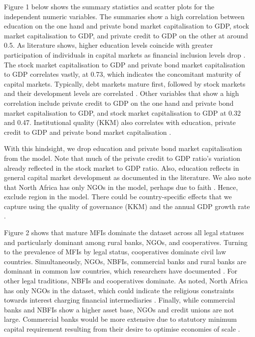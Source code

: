 \documentclass[a4paper, nobind]{templates/ociamthesis}
\begin{document}
Figure 1 below shows the summary statistics and scatter plots for the independent numeric variables. The summaries show a high correlation between education on the one hand and private bond market capitalisation to GDP, stock market capitalisation to GDP, and private credit to GDP on the other at around 0.5. As literature shows, higher education levels coincide with greater participation of individuals in capital markets as financial inclusion levels drop \autocite{allen2013resolving,allen2014african}. The stock market capitalisation to GDP and private bond market capitalisation to GDP correlates vastly, at 0.73, which indicates the concomitant maturity of capital markets. Typically, debt markets mature first, followed by stock markets and their development levels are correlated \autocite{levine1999stock}. Other variables that show a high correlation include private credit to GDP on the one hand and private bond market capitalisation to GDP, and stock market capitalisation to GDP at 0.32 and 0.47. Institutional quality (KKM) also correlates with education, private credit to GDP and private bond market capitalisation \autocite{yartey2008determinants}.

With this hindsight, we drop education and private bond market capitalisation from the model. Note that much of the private credit to GDP ratio's variation already reflected in the stock market to GDP ratio. Also, education reflects in general capital market development as documented in the literature. We also note that North Africa has only NGOs in the model, perhaps due to faith \autocite{allen2013resolving,allen2014african,hassan2018religious}. Hence, exclude region in the model. There could be country-specific effects that we capture using the quality of governance (KKM) \autocite{kunvcivc2014institutional} and the annual GDP growth rate \autocite{butkiewicz2006institutional}.

Figure 2 shows that mature MFIs dominate the dataset across all legal statuses and particularly dominant among rural banks, NGOs, and cooperatives. Turning to the prevalence of MFIs by legal status, cooperatives dominate civil law countries. Simultaneously, NGOs, NBFIs, commercial banks and rural banks are dominant in common law countries, which researchers have documented \autocite{pashkova2016business}. For other legal traditions, NBFIs and cooperatives dominate. As noted, North Africa has only NGOs in the dataset, which could indicate the religious constraints towards interest charging financial intermediaries \autocite{hassan2018religious}. Finally, while commercial banks and NBFIs show a higher asset base, NGOs and credit unions are not large. Commercial banks would be more extensive due to statutory minimum capital requirement resulting from their desire to optimise economies of scale \autocite{aiyar2016does}.
\end{document}
